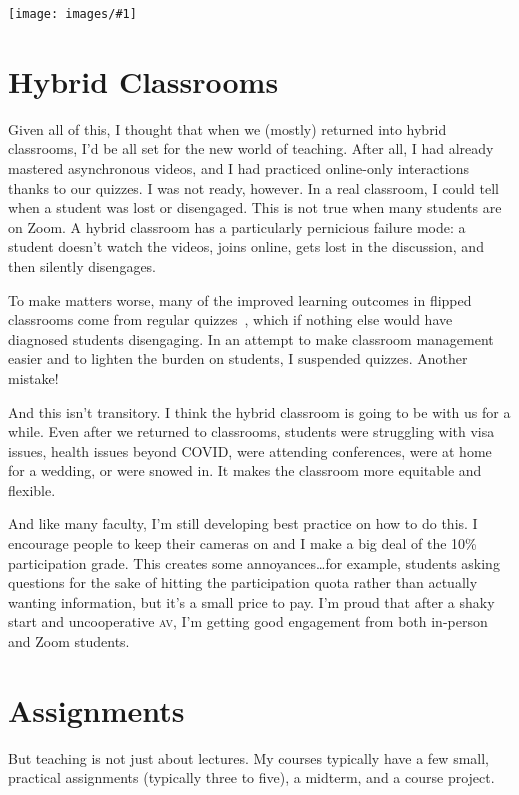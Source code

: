 \documentclass[11pt]{amsart}
\newcommand{\abr}[1]{\textsc{#1}}
\newcommand{\image}[2]{  \begin{center}
\texttt{[image: images/\#1]}
\end{center}
  }
\begin{document}
\image{efficient_qa}{}

\section{Hybrid Classrooms}

Given all of this, I thought that when we (mostly) returned into
hybrid classrooms, I'd be all set for the new world of teaching.
After all, I had already mastered asynchronous videos, and I had
practiced online-only interactions thanks to our quizzes.  I was not
ready, however.  In a real classroom, I could tell when a student was
lost or disengaged.  This is not true when many students are on Zoom.
A hybrid classroom has a particularly pernicious failure mode: a
student doesn't watch the videos, joins online, gets lost in the
discussion, and then silently disengages.

To make matters worse, many of the improved learning outcomes in
flipped classrooms come from regular quizzes~\cite{tune-13}, which if
nothing else would have diagnosed students disengaging. In an attempt
to make classroom management easier and to lighten the burden on
students, I suspended quizzes.  Another mistake!

And this isn't transitory.  I think the hybrid classroom is going to
be with us for a while.  Even after we returned to classrooms,
students were struggling with visa issues, health issues beyond COVID,
were attending conferences, were at home for a wedding, or were snowed
in.  It makes the classroom more equitable and flexible.

And like many faculty, I'm still developing best practice on how to do
this.  I encourage people to keep their cameras on and I make a big
deal of the 10\% participation grade.  This creates some
annoyances\dots for example, students asking questions for the sake of
hitting the participation quota rather than actually wanting
information, but it's a small price to pay.  I'm proud that after a
shaky start and uncooperative \abr{av}, I'm getting good engagement
from both in-person and Zoom students.

\section{Assignments}

But teaching is not just about lectures.  My courses typically have a
few small, practical assignments (typically three to five), a midterm,
and a course project.
\end{document}
